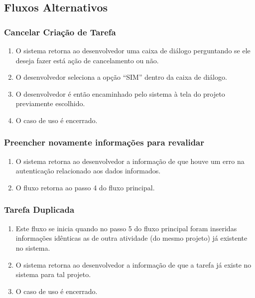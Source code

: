 \subsection{Fluxos Alternativos}

\subsubsection{Cancelar Criação de Tarefa}

\begin{enumerate}
  \item O sistema retorna ao desenvolvedor uma caixa de diálogo perguntando se ele deseja fazer está ação de cancelamento ou não.
  \item O desenvolvedor seleciona a opção “SIM” dentro da caixa de diálogo.
  \item O desenvolvedor é então encaminhado pelo sistema à tela do projeto previamente escolhido.
  \item O caso de uso é encerrado.
\end{enumerate}

\subsubsection{Preencher novamente informações para revalidar}

\begin{enumerate}
  \item O sistema retorna ao desenvolvedor a informação de que houve um erro na autenticação relacionado aos dados informados.
  \item O fluxo retorna ao passo 4 do fluxo principal.
\end{enumerate}

\subsubsection{Tarefa Duplicada}

\begin{enumerate}
  \item Este fluxo se inicia quando no passo 5 do fluxo principal foram inseridas informações idênticas as de outra atividade (do mesmo projeto) já existente no sistema.
  \item O sistema retorna ao desenvolvedor a informação de que a tarefa já existe no sistema para tal projeto.
  \item O caso de uso é encerrado.
\end{enumerate}



